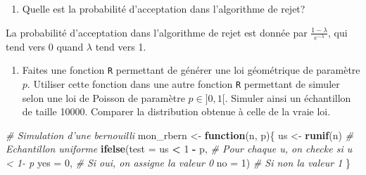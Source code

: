 \documentclass[]{article}
\newenvironment{Shaded}{\begin{snugshade}}{\end{snugshade}}
\newcommand{\CommentTok}[1]{\textcolor[rgb]{0.56,0.35,0.01}{\textit{#1}}}
\newcommand{\ControlFlowTok}[1]{\textcolor[rgb]{0.13,0.29,0.53}{\textbf{#1}}}
\newcommand{\DataTypeTok}[1]{\textcolor[rgb]{0.13,0.29,0.53}{#1}}
\newcommand{\DecValTok}[1]{\textcolor[rgb]{0.00,0.00,0.81}{#1}}
\newcommand{\KeywordTok}[1]{\textcolor[rgb]{0.13,0.29,0.53}{\textbf{#1}}}
\newcommand{\NormalTok}[1]{#1}
\newcommand{\OperatorTok}[1]{\textcolor[rgb]{0.81,0.36,0.00}{\textbf{#1}}}
\newcommand{\StringTok}[1]{\textcolor[rgb]{0.31,0.60,0.02}{#1}}
\providecommand{\tightlist}{%
  \setlength{\itemsep}{0pt}\setlength{\parskip}{0pt}}
\newenvironment{Correction}%
  { \vspace{\baselineskip}\begin{mdframed}[backgroundcolor=my_green]}%
  {\end{mdframed}}
\begin{document}
\begin{enumerate}
\def\labelenumi{\arabic{enumi}.}
\setcounter{enumi}{3}
\tightlist
\item
  Quelle est la probabilité d'acceptation dans l'algorithme de rejet?
\end{enumerate}

\begin{Correction}
La probabilité d'acceptation dans l'algorithme de rejet est donnée par
$\frac{1 - \lambda}{e^{-\lambda}}$, qui tend vers 0 quand $\lambda$ tend vers 1.
\end{Correction}

\begin{enumerate}
\def\labelenumi{\arabic{enumi}.}
\setcounter{enumi}{4}
\tightlist
\item
  Faites une fonction \texttt{R} permettant de générer une loi
  géométrique de paramètre \(p\). Utiliser cette fonction dans une autre
  fonction \texttt{R} permettant de simuler selon une loi de Poisson de
  paramètre \(p \in ]0, 1[\). Simuler ainsi un échantillon de taille
  10000. Comparer la distribution obtenue à celle de la vraie loi.
\end{enumerate}

\begin{Shaded}
\begin{Highlighting}[]
\CommentTok{# Simulation d'une bernouilli}
\NormalTok{mon_rbern <-}\StringTok{ }\ControlFlowTok{function}\NormalTok{(n, p)\{}
\NormalTok{  us <-}\StringTok{ }\KeywordTok{runif}\NormalTok{(n) }\CommentTok{# Echantillon uniforme}
  \KeywordTok{ifelse}\NormalTok{(}\DataTypeTok{test =}\NormalTok{ us }\OperatorTok{<}\StringTok{ }\DecValTok{1} \OperatorTok{-}\StringTok{ }\NormalTok{p, }\CommentTok{# Pour chaque u, on checke si u < 1- p}
         \DataTypeTok{yes =} \DecValTok{0}\NormalTok{, }\CommentTok{# Si oui, on assigne la valeur 0}
         \DataTypeTok{no =} \DecValTok{1}\NormalTok{)  }\CommentTok{# Si non la valeur 1}
\NormalTok{\}}
\end{Highlighting}
\end{Shaded}
\end{document}
